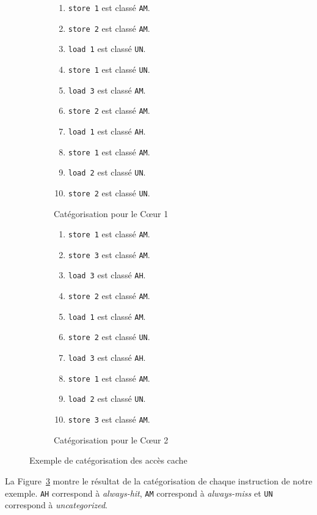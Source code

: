 \begin{example}
\label{fr:ex:analysis:instr_chara}
\begin{figure}[hbt]
\begin{center}
\begin{subfigure}[t]{0.45\textwidth}
\centering
\begin{enumerate}
    \setlength{\itemsep}{0pt}%
   \setlength{\parskip}{0pt}%
\item \texttt{store 1} est classé \texttt{AM}.
\item \texttt{store 2} est classé \texttt{AM}.
\item \texttt{load 1} est classé \texttt{UN}.
\item \texttt{store 1} est classé \texttt{UN}.
\item \texttt{load 3} est classé \texttt{AM}.
\item \texttt{store 2} est classé \texttt{AM}.
\item \texttt{load 1} est classé \texttt{AH}.
\item \texttt{store 1} est classé \texttt{AM}.
\item \texttt{load 2} est classé \texttt{UN}.
\item \texttt{store 2} est classé \texttt{UN}.
\end{enumerate}
\caption{Catégorisation pour le Cœur 1}
\label{fr:fig:analysis:demo_chara_prog1}
\end{subfigure}
\begin{subfigure}[t]{0.45\textwidth}
\centering
\begin{enumerate}
    \setlength{\itemsep}{0pt}%
   \setlength{\parskip}{0pt}%
\item \texttt{store 1} est classé \texttt{AM}.
\item \texttt{store 3} est classé \texttt{AM}.
\item \texttt{load 3} est classé \texttt{AH}.
\item \texttt{store 2} est classé \texttt{AM}.
\item \texttt{load 1} est classé \texttt{AM}.
\item \texttt{store 2} est classé \texttt{UN}.
\item \texttt{load 3} est classé \texttt{AH}.
\item \texttt{store 1} est classé \texttt{AM}.
\item \texttt{load 2} est classé \texttt{UN}.
\item \texttt{store 3} est classé \texttt{AM}.
\end{enumerate}
\caption{Catégorisation pour le Cœur 2}
\label{fr:fig:analysis:demo_chara_prog2}
\end{subfigure}
\end{center}
\caption{Exemple de catégorisation des accès cache}
\label{fr:fig:analysis:demo_chara_progs}
\end{figure}
La Figure~\ref{fr:fig:analysis:demo_chara_progs} montre le résultat de la
catégorisation de chaque instruction de notre exemple.
\texttt{AH} correspond à \textit{always-hit}, \texttt{AM} correspond
à \textit{always-miss} et \texttt{UN} correspond
à \textit{uncategorized}.
\end{example}

